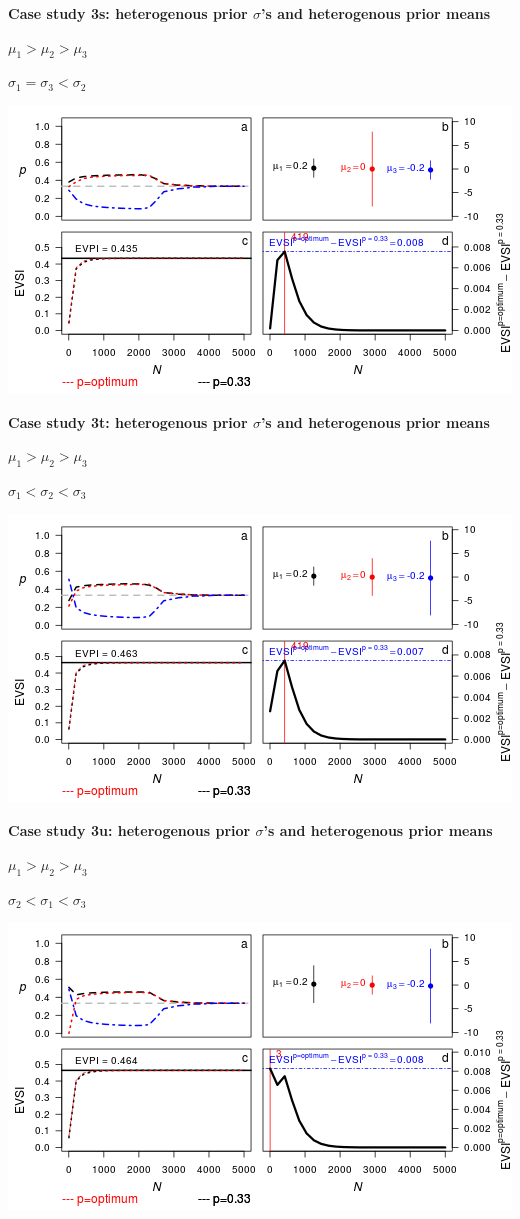 \documentclass[]{article}
\theoremstyle{definition}
\theoremstyle{definition}
\theoremstyle{remark}
\begin{document}
\textbf{Case study 3s: heterogenous prior \(\sigma\)'s and heterogenous
prior means}

\(\mu_1 > \mu_2 > \mu_3\)

\(\sigma_1 = \sigma_3 < \sigma_2\)

\includegraphics{figure/x10n1_1__1_1c-1.png} \clearpage

\textbf{Case study 3t: heterogenous prior \(\sigma\)'s and heterogenous
prior means}

\(\mu_1 > \mu_2 > \mu_3\)

\(\sigma_1 < \sigma_2 < \sigma_3\)

\includegraphics{figure/x10n1_1__1___1c-1.png} \clearpage  

\textbf{Case study 3u: heterogenous prior \(\sigma\)'s and heterogenous
prior means}

\(\mu_1 > \mu_2 > \mu_3\)

\(\sigma_2 < \sigma_1 < \sigma_3\)

\includegraphics{figure/x10n1__1_1___1c-1.png} \clearpage
\end{document}

